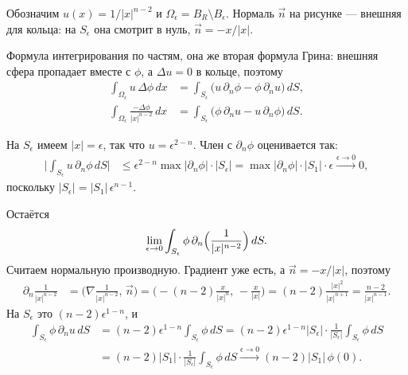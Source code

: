 \documentclass[12pt,a4paper]{article}
\begin{document}
Обозначим \(u(x)=1/|x|^{n-2}\) и
\(\Omega_\epsilon=B_R\setminus B_\epsilon\).
Нормаль \(\vec n\) на рисунке --- внешняя для кольца:
на \(S_\epsilon\) она смотрит в нуль, \(\vec n=-x/|x|\).

\begin{center}
\end{center}

Формула интегрирования по частям, она же вторая формула Грина:
внешняя сфера пропадает вместе с \(\phi\), а \(\Delta u=0\) в кольце, поэтому
\begin{align*}
\int_{\Omega_\epsilon} u\,\Delta\phi\,dx
&=
\int_{S_\epsilon}
    \bigl(
        u\,\partial_n\phi
        -
        \phi\,\partial_n u
    \bigr)\,dS, \\
\int_{\Omega_\epsilon}
    \frac{-\Delta\phi}{|x|^{n-2}}\,dx
&=
\int_{S_\epsilon}
    \bigl(
        \phi\,\partial_n u
        -
        u\,\partial_n\phi
    \bigr)\,dS.
\end{align*}

На \(S_\epsilon\) имеем \(|x|=\epsilon\), так что \(u=\epsilon^{2-n}\).
Член с \(\partial_n\phi\) оценивается так:
\begin{align*}
\Biggl|
    \int_{S_\epsilon} u\,\partial_n\phi\,dS
\Biggr|
&\le
\epsilon^{2-n}\max|\partial_n\phi|\cdot|S_\epsilon|
=
\max|\partial_n\phi|\cdot|S_1|\cdot\epsilon
\xrightarrow{\epsilon\to 0} 0,
\end{align*}
поскольку \(|S_\epsilon|=|S_1|\,\epsilon^{n-1}\).

Остаётся
\[
\lim_{\epsilon\to 0}
\int_{S_\epsilon}
    \phi\,
    \partial_n\Bigl(\frac{1}{|x|^{n-2}}\Bigr)\,dS.
\]
Считаем нормальную производную.
Градиент уже есть, а \(\vec n=-x/|x|\), поэтому
\begin{align*}
\partial_n\frac{1}{|x|^{n-2}}
&=
\Biggl(
    \nabla\frac{1}{|x|^{n-2}},\,
    \vec n
\Biggr)
=
\Biggl(
    -(n-2)\frac{x}{|x|^n},\,
    -\frac{x}{|x|}
\Biggr)
=
(n-2)\frac{|x|^2}{|x|^{n+1}}
=
\frac{n-2}{|x|^{n-1}}.
\end{align*}
На \(S_\epsilon\) это \((n-2)\epsilon^{1-n}\), и
\begin{align*}
\int_{S_\epsilon}
    \phi\,\partial_n u\,dS
&=
(n-2)\epsilon^{1-n}
\int_{S_\epsilon}\phi\,dS
=
(n-2)\epsilon^{1-n}|S_\epsilon|
\cdot
\frac{1}{|S_\epsilon|}
\int_{S_\epsilon}\phi\,dS \\
&=
(n-2)|S_1|
\cdot
\frac{1}{|S_\epsilon|}
\int_{S_\epsilon}\phi\,dS
\xrightarrow{\epsilon\to 0}
(n-2)|S_1|\,\phi(0).
\end{align*}
\end{document}
